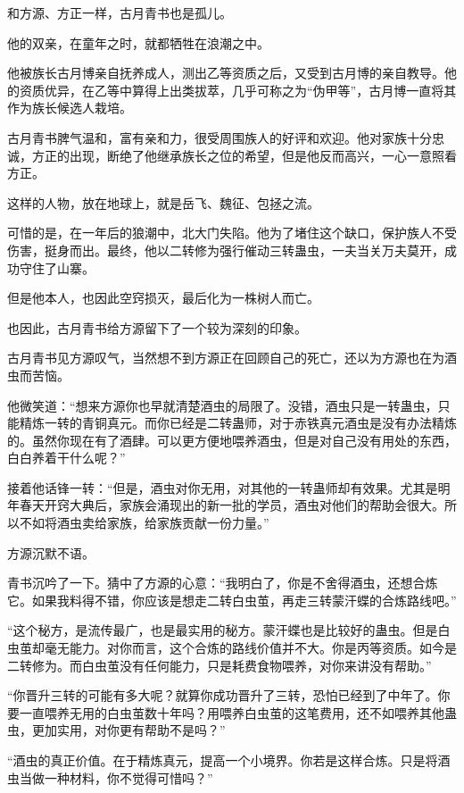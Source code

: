 
\begin{this_body}

和方源、方正一样，古月青书也是孤儿。

他的双亲，在童年之时，就都牺牲在浪潮之中。

他被族长古月博亲自抚养成人，测出乙等资质之后，又受到古月博的亲自教导。他的资质优异，在乙等中算得上出类拔萃，几乎可称之为“伪甲等”，古月博一直将其作为族长候选人栽培。

古月青书脾气温和，富有亲和力，很受周围族人的好评和欢迎。他对家族十分忠诚，方正的出现，断绝了他继承族长之位的希望，但是他反而高兴，一心一意照看方正。

这样的人物，放在地球上，就是岳飞、魏征、包拯之流。

可惜的是，在一年后的狼潮中，北大门失陷。他为了堵住这个缺口，保护族人不受伤害，挺身而出。最终，他以二转修为强行催动三转蛊虫，一夫当关万夫莫开，成功守住了山寨。

但是他本人，也因此空窍损灭，最后化为一株树人而亡。

也因此，古月青书给方源留下了一个较为深刻的印象。

古月青书见方源叹气，当然想不到方源正在回顾自己的死亡，还以为方源也在为酒虫而苦恼。

他微笑道：“想来方源你也早就清楚酒虫的局限了。没错，酒虫只是一转蛊虫，只能精炼一转的青铜真元。而你已经是二转蛊师，对于赤铁真元酒虫是没有办法精炼的。虽然你现在有了酒肆。可以更方便地喂养酒虫，但是对自己没有用处的东西，白白养着干什么呢？”

接着他话锋一转：“但是，酒虫对你无用，对其他的一转蛊师却有效果。尤其是明年春天开窍大典后，家族会涌现出的新一批的学员，酒虫对他们的帮助会很大。所以不如将酒虫卖给家族，给家族贡献一份力量。”

方源沉默不语。

青书沉吟了一下。猜中了方源的心意：“我明白了，你是不舍得酒虫，还想合炼它。如果我料得不错，你应该是想走二转白虫茧，再走三转蒙汗蝶的合炼路线吧。”

“这个秘方，是流传最广，也是最实用的秘方。蒙汗蝶也是比较好的蛊虫。但是白虫茧却毫无能力。对你而言，这个合炼的路线价值并不大。你是丙等资质。如今是二转修为。而白虫茧没有任何能力，只是耗费食物喂养，对你来讲没有帮助。”

“你晋升三转的可能有多大呢？就算你成功晋升了三转，恐怕已经到了中年了。你要一直喂养无用的白虫茧数十年吗？用喂养白虫茧的这笔费用，还不如喂养其他蛊虫，更加实用，对你更有帮助不是吗？”

“酒虫的真正价值。在于精炼真元，提高一个小境界。你若是这样合炼。只是将酒虫当做一种材料，你不觉得可惜吗？”


\end{this_body}
